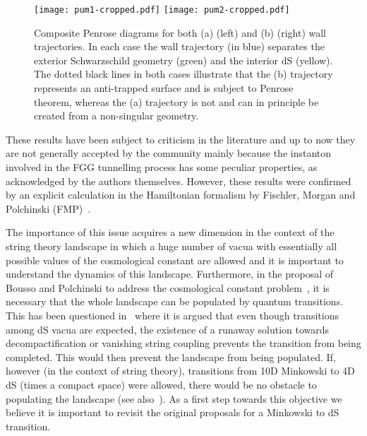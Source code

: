 \documentclass[11pt,a4paper]{article}
\begin{document}
\begin{figure}[h!] 
\begin{center} 
\texttt{[image: pum1-cropped.pdf]} 
\qquad
\texttt{[image: pum2-cropped.pdf]} 
\caption{\footnotesize{Composite Penrose diagrams for both (a) (left) and (b) (right) wall trajectories. In each case the wall trajectory (in blue) separates the exterior Schwarzschild geometry (green) and the interior dS (yellow). The dotted black lines in both cases illustrate that the (b) trajectory represents an anti-trapped surface and is subject to Penrose theorem, whereas the (a) trajectory is not and can in principle be created from a non-singular geometry.}\label{fig:Trajectories}}
\end{center} 
\end{figure} 
These results have been subject to criticism in the literature and up to now they are not generally accepted by the community mainly because the instanton involved in the FGG tunnelling process has some peculiar properties, as acknowledged by the authors themselves. However, these results were confirmed by an explicit calculation in the Hamiltonian formalism by Fischler, Morgan and Polchinski (FMP)~\cite{Fischler:1989se,Fischler:1990pk}. 

The importance of this issue acquires a new dimension in the context of the string theory landscape in which a huge number of vacua with essentially all possible values of the cosmological constant are allowed and it is important to understand the dynamics of this landscape. Furthermore, in the proposal of Bousso and Polchinski to address the cosmological constant problem~\cite{Bousso:2000xa}, it is necessary that the whole landscape can be populated by quantum transitions. This has been questioned in~\cite{Johnson:2008vn, Aguirre:2009tp} where it is argued that even though transitions among dS vacua are expected, the existence of a runaway solution towards decompactification or vanishing string coupling prevents the transition from being completed. This would then prevent the landscape from being populated. If, however (in the context of string theory), transitions from 10D Minkowski to 4D dS (times a compact space) were allowed, there would be no obstacle to populating the landscape (see also~\cite{Brown:2011ry}). As a first step towards this objective we believe it is important to revisit the original proposals for a Minkowski to dS transition. 
\end{document}
